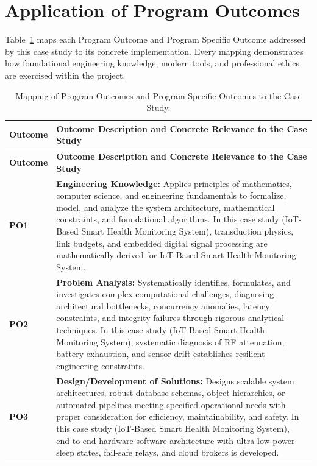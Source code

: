 \section{Application of Program Outcomes}
Table~\ref{tab:po} maps each Program Outcome and Program Specific Outcome addressed by this case study to its concrete implementation. Every mapping demonstrates how foundational engineering knowledge, modern tools, and professional ethics are exercised within the project.

{\small
\begin{longtable}{@{}>{\centering\arraybackslash}p{1.8cm} p{13.2cm}@{}}
    \caption{Mapping of Program Outcomes and Program Specific Outcomes to the Case Study.}\label{tab:po}\\
    \toprule
    \textbf{Outcome} & \textbf{Outcome Description and Concrete Relevance to the Case Study} \\
    \midrule
    \endfirsthead
    \toprule
    \textbf{Outcome} & \textbf{Outcome Description and Concrete Relevance to the Case Study} \\
    \midrule
    \endhead
\textbf{PO1} & \textbf{Engineering Knowledge:} Applies principles of mathematics, computer science, and engineering fundamentals to formalize, model, and analyze the system architecture, mathematical constraints, and foundational algorithms. In this case study (IoT-Based Smart Health Monitoring System), transduction physics, link budgets, and embedded digital signal processing are mathematically derived for IoT-Based Smart Health Monitoring System. \\
    \addlinespace
\textbf{PO2} & \textbf{Problem Analysis:} Systematically identifies, formulates, and investigates complex computational challenges, diagnosing architectural bottlenecks, concurrency anomalies, latency constraints, and integrity failures through rigorous analytical techniques. In this case study (IoT-Based Smart Health Monitoring System), systematic diagnosis of RF attenuation, battery exhaustion, and sensor drift establishes resilient engineering constraints. \\
    \addlinespace
\textbf{PO3} & \textbf{Design/Development of Solutions:} Designs scalable system architectures, robust database schemas, object hierarchies, or automated pipelines meeting specified operational needs with proper consideration for efficiency, maintainability, and safety. In this case study (IoT-Based Smart Health Monitoring System), end-to-end hardware-software architecture with ultra-low-power sleep states, fail-safe relays, and cloud brokers is developed. \\

\end{longtable}}
